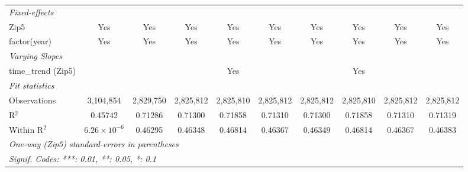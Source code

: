 \begin{table}[H]
{\begin{tabular}{lccccccccc}
 \midrule \emph{Fixed-effects}&   &   &   &   &   &   &   &   &  \\ 

 Zip5 & Yes & Yes & Yes & Yes & Yes & Yes & Yes & Yes & Yes\\ 

 factor(year) & Yes & Yes & Yes & Yes & Yes & Yes & Yes & Yes & Yes\\ 

 \midrule \emph{Varying Slopes}&   &   &   &   &   &   &   &   &  \\ 

 time\_trend (Zip5) &  &  &  & Yes &  &  & Yes &  & \\ 

 \midrule \emph{Fit statistics}&  & & & & & & & & \\ 

 Observations & 3,104,854&2,829,750&2,825,812&2,825,810&2,825,812&2,825,812&2,825,810&2,825,812&2,825,812\\ 

 R$^2$ & 0.45742&0.71286&0.71300&0.71858&0.71310&0.71300&0.71858&0.71310&0.71319\\ 

 Within R$^2$ & $6.26\times 10^{-6}$&0.46295&0.46348&0.46814&0.46367&0.46349&0.46814&0.46367&0.46383\\ 

 \midrule\midrule\multicolumn{10}{l}{\emph{One-way (Zip5) standard-errors in parentheses}}\\ 

 \multicolumn{10}{l}{\emph{Signif. Codes: ***: 0.01, **: 0.05, *: 0.1}}\\ 

 \end{tabular}} 

 \end{table} 

  


